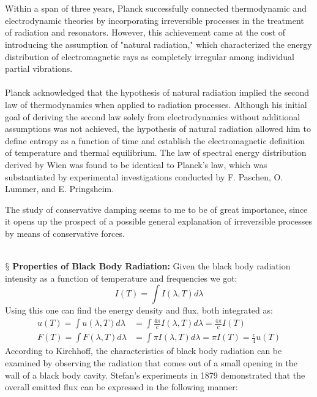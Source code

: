 \documentclass[9pt,a4paper, twocolumn]{article}
\newcounter{theo}
\newcommand{\newpoint}[1]{\ \\ \indent$\mathsection$ \textbf{#1}}
\begin{document}
            \\
            \\
            Within a span of three years, Planck successfully connected thermodynamic and electrodynamic theories by incorporating irreversible processes in the treatment of radiation and resonators. However, this achievement came at the cost of introducing the assumption of "natural radiation," which characterized the energy distribution of electromagnetic rays as completely irregular among individual partial vibrations.
            \\
            \\
            Planck acknowledged that the hypothesis of natural radiation implied the second law of thermodynamics when applied to radiation processes. Although his initial goal of deriving the second law solely from electrodynamics without additional assumptions was not achieved, the hypothesis of natural radiation allowed him to define entropy as a function of time and establish the electromagnetic definition of temperature and thermal equilibrium. The law of spectral energy distribution derived by Wien was found to be identical to Planck's law, which was substantiated by experimental investigations conducted by F. Paschen, O. Lummer, and E. Pringsheim.
            \begin{qt}
                The study of conservative damping seems to me to be of great importance, since it opens up the prospect of a possible general explanation of irreversible processes by means of conservative forces.
            \end{qt}
            \newpoint{Properties of Black Body Radiation:} Given the black body radiation intensity as a function of temperature and frequencies we got:
            \begin{equation}
                I(T) = \int I(\lambda, T) d\lambda
            \end{equation}
            Using this one can find the energy density and flux, both integrated as:
            \begin{align}
                u(T) = \int u(\lambda, T)d\lambda &= \int \frac{4\pi}{c}I(\lambda, T)d\lambda = \frac{4\pi}{c}I(T)\\
                F(T) = \int F(\lambda, T)d\lambda &= \int \pi I(\lambda, T)d\lambda = \pi I(T) = \frac c4 u(T)
            \end{align}
            According to Kirchhoff, the characteristics of black body radiation can be examined by observing the radiation that comes out of a small opening in the wall of a black body cavity. Stefan's experiments in 1879 demonstrated that the overall emitted flux can be expressed in the following manner:
\end{document}
